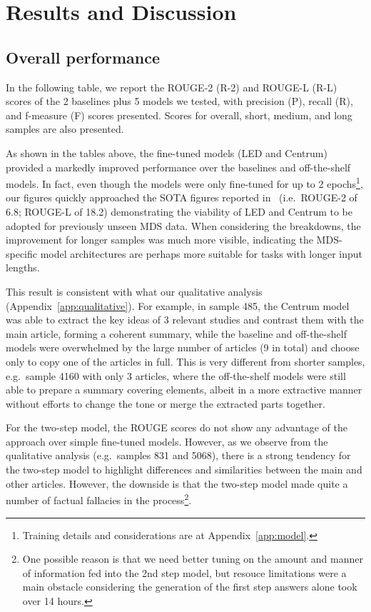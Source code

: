 \documentclass[12pt, twocolumn]{article}
\numberwithin{equation}{section}
\begin{document}
\section{Results and Discussion}
\label{sec:results}

\subsection{Overall performance}
\label{ssec:results-overall}

In the following table, we report the ROUGE-2 (R-2) and ROUGE-L (R-L) scores of the 2 baselines plus 5 models we tested, with precision (P), recall (R), and f-measure (F) scores presented.  Scores for overall, short, medium, and long samples are also presented.

As shown in the tables above, the fine-tuned models (LED and Centrum) provided a markedly improved performance over the baselines and off-the-shelf models.  In fact, even though the models were only fine-tuned for up to 2 epochs\footnote{Training details and considerations are at Appendix~\ref{app:model}.}, our figures quickly approached the SOTA figures reported in~\cite{xiao2022primera} (i.e.~ROUGE-2 of 6.8; ROUGE-L of 18.2) demonstrating the viability of LED and Centrum to be adopted for previously unseen MDS data.  When considering the breakdowns, the improvement for longer samples was much more visible, indicating the MDS-specific model architectures are perhaps more suitable for tasks with longer input lengths.  

This result is consistent with what our qualitative analysis (Appendix~\ref{app:qualitative}).  For example, in sample 485, the Centrum model was able to extract the key ideas of 3 relevant studies and contrast them with the main article, forming a coherent summary, while the baseline and off-the-shelf models were overwhelmed by the large number of articles (9 in total) and choose only to copy one of the articles in full.  This is very different from shorter samples, e.g.~sample 4160 with only 3 articles, where the off-the-shelf models were still able to prepare a summary covering elements, albeit in a more extractive manner without efforts to change the tone or merge the extracted parts together.

For the two-step model, the ROUGE scores do not show any advantage of the approach over simple fine-tuned models.  However, as we observe from the qualitative analysis (e.g.~samples 831 and 5068), there is a strong tendency for the two-step model to highlight differences and similarities between the main and other articles.  However, the downside is that the two-step model made quite a number of factual fallacies in the process\footnote{One possible reason is that we need better tuning on the amount and manner of information fed into the 2nd step model, but resouce limitations were a main obstacle considering the generation of the first step answers alone took over 14 hours.}.
\end{document}
